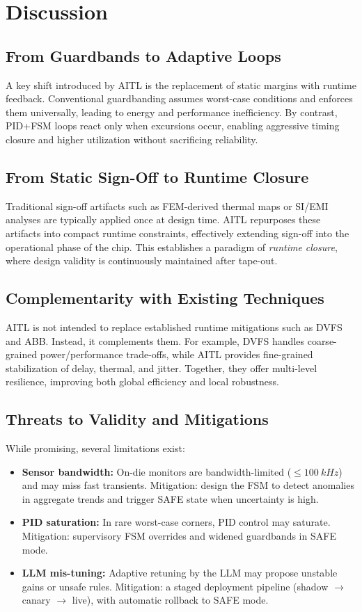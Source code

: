 \documentclass[conference]{IEEEtran}
\begin{document}
\section{Discussion}

\subsection{From Guardbands to Adaptive Loops}
A key shift introduced by AITL is the replacement of static margins with runtime feedback. Conventional guardbanding assumes worst-case conditions and enforces them universally, leading to energy and performance inefficiency. By contrast, PID+FSM loops react only when excursions occur, enabling aggressive timing closure and higher utilization without sacrificing reliability.

\subsection{From Static Sign-Off to Runtime Closure}
Traditional sign-off artifacts such as FEM-derived thermal maps or SI/EMI analyses are typically applied once at design time. AITL repurposes these artifacts into compact runtime constraints, effectively extending sign-off into the operational phase of the chip. This establishes a paradigm of \emph{runtime closure}, where design validity is continuously maintained after tape-out.

\subsection{Complementarity with Existing Techniques}
AITL is not intended to replace established runtime mitigations such as DVFS and ABB. Instead, it complements them. For example, DVFS handles coarse-grained power/performance trade-offs, while AITL provides fine-grained stabilization of delay, thermal, and jitter. Together, they offer multi-level resilience, improving both global efficiency and local robustness.

\subsection{Threats to Validity and Mitigations}
While promising, several limitations exist:
\begin{itemize}
  \item \textbf{Sensor bandwidth:} On-die monitors are bandwidth-limited ($\leq \SI{100}{kHz}$) and may miss fast transients. Mitigation: design the FSM to detect anomalies in aggregate trends and trigger SAFE state when uncertainty is high.
  \item \textbf{PID saturation:} In rare worst-case corners, PID control may saturate. Mitigation: supervisory FSM overrides and widened guardbands in SAFE mode.
  \item \textbf{LLM mis-tuning:} Adaptive retuning by the LLM may propose unstable gains or unsafe rules. Mitigation: a staged deployment pipeline (shadow $\rightarrow$ canary $\rightarrow$ live), with automatic rollback to SAFE mode.
\end{itemize}
\end{document}
